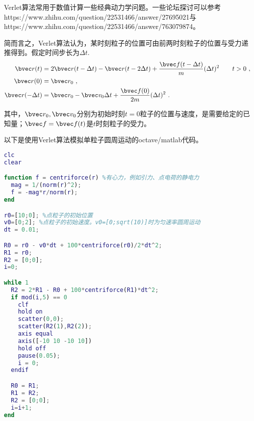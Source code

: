 

\begin{issues}
\issueNeedCite
\end{issues}

Verlet算法常用于数值计算一些经典动力学问题。一些论坛探讨可以参考https://www.zhihu.com/question/22531466/answer/27695021与https://www.zhihu.com/question/22531466/answer/763079874。

简而言之，Verlet算法认为，某时刻粒子的位置可由前两时刻粒子的位置与受力递推得到。假定时间步长为$\Delta t$.
\begin{equation}
\begin{aligned}
\bvec r (t) &= 2\bvec r(t-\Delta t) - \bvec r(t-2\Delta t) + \frac{\bvec f(t-\Delta t)}{m}(\Delta t)^2 \qquad t>0~,\\
\bvec r (0) &= \bvec r_0~,\\
\bvec r (- \Delta t) &= \bvec r_0 - \bvec v_0 \Delta t + \frac{\bvec f(0)}{2m}(\Delta t)^2~.\\
\end{aligned}
\end{equation}

其中，$\bvec r_0, \bvec v_0$分别为初始时刻$t=0$粒子的位置与速度，是需要给定的已知量；$\bvec f = \bvec f(t)$是$t$时刻粒子的受力。

以下是使用Verlet算法模拟单粒子圆周运动的octave/matlab代码。
\begin{lstlisting}[language=matlab]
clc
clear

function f = centriforce(r) %有心力，例如引力、点电荷的静电力
  mag = 1/(norm(r)^2);
  f = -mag*r/norm(r);
end

r0=[10;0]; %点粒子的初始位置
v0=[0;2]; %点粒子的初始速度。v0=[0;sqrt(10)]时为匀速率圆周运动
dt = 0.01;

R0 = r0 - v0*dt + 100*centriforce(r0)/2*dt^2;
R1 = r0;
R2 = [0;0];
i=0;

while 1
  R2 = 2*R1 - R0 + 100*centriforce(R1)*dt^2;
  if mod(i,5) == 0
    clf
    hold on
    scatter(0,0);
    scatter(R2(1),R2(2));
    axis equal
    axis([-10 10 -10 10])
    hold off
    pause(0.05);
    i = 0;
  endif

  R0 = R1;
  R1 = R2;
  R2 = [0;0];
  i=i+1;
end

\end{lstlisting}
